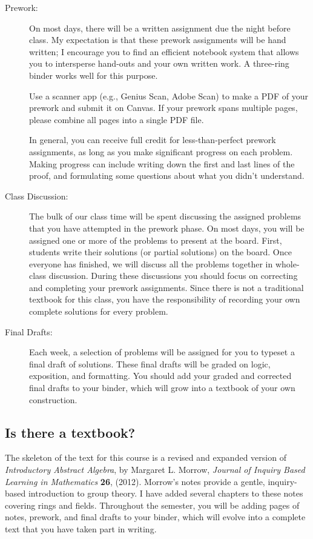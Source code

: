 \documentclass[
  twoside]{article}
\begin{document}
\begin{description}
          \item[Prework:] On most days, there will be a written assignment due the night before class. My expectation is that these prework assignments will be hand written; I encourage you to find an efficient notebook system that allows you to intersperse hand-outs and your own written work. A three-ring binder works well for this purpose.
          
Use a scanner app (e.g., Genius Scan, Adobe Scan) to make a PDF of your prework and submit it on Canvas. If your prework spans multiple pages, please combine all pages into a single PDF file.
          
In general, you can receive full credit for less-than-perfect prework assignments, as long as you make significant progress on each problem.  Making progress can include writing down the first and last lines of the proof, and formulating some questions about what you didn't understand.
          \item[Class Discussion:] The bulk of our class time will be spent discussing the assigned problems that you have attempted in the prework phase. On most days, you will be assigned one or more of the problems to present at the board. First,  students write their solutions (or partial solutions) on the board. Once everyone has finished, we will discuss all the problems together in whole-class discussion. During these discussions you should focus on correcting and completing your prework assignments. Since there is not a traditional textbook for this class, you have the responsibility of recording your own complete solutions for every problem.
          \item[Final Drafts:]  Each week, a selection of problems will be assigned for you to typeset a final draft of solutions. These final drafts will be graded on logic, exposition, and formatting. You should add your graded and corrected final drafts to your binder, which will grow into a textbook of your own construction.
      \end{description}

\hypertarget{is-there-a-textbook}{%
\subsection{Is there a textbook?}\label{is-there-a-textbook}}

The skeleton of the text for this course is a revised and expanded
version of \textit{Introductory Abstract Algebra}, by Margaret L.
Morrow, \textit{Journal of Inquiry Based Learning in Mathematics}
\textbf{26}, (2012). Morrow's notes provide a gentle, inquiry-based
introduction to group theory. I have added several chapters to these
notes covering rings and fields. Throughout the semester, you will be
adding pages of notes, prework, and final drafts to your binder, which
will evolve into a complete text that you have taken part in writing.
\end{document}
